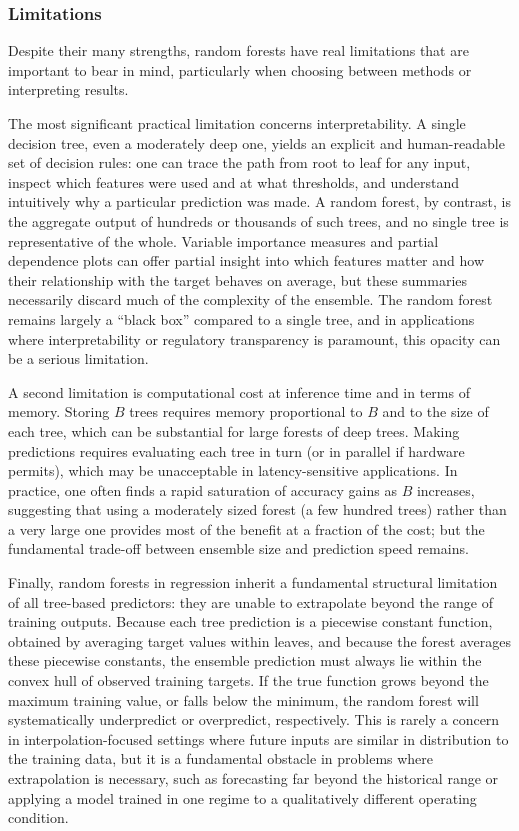\subsubsection*{Limitations}

Despite their many strengths, random forests have real limitations that are important to bear in mind, particularly when choosing between methods or interpreting results.

The most significant practical limitation concerns \alert{interpretability}. A single decision tree, even a moderately deep one, yields an explicit and human-readable set of decision rules: one can trace the path from root to leaf for any input, inspect which features were used and at what thresholds, and understand intuitively why a particular prediction was made. A random forest, by contrast, is the aggregate output of hundreds or thousands of such trees, and no single tree is representative of the whole. Variable importance measures and partial dependence plots can offer partial insight into which features matter and how their relationship with the target behaves on average, but these summaries necessarily discard much of the complexity of the ensemble. The random forest remains largely a ``black box'' compared to a single tree, and in applications where interpretability or regulatory transparency is paramount, this opacity can be a serious limitation.

A second limitation is computational cost at inference time and in terms of memory. Storing $B$ trees requires memory proportional to $B$ and to the size of each tree, which can be substantial for large forests of deep trees. Making predictions requires evaluating each tree in turn (or in parallel if hardware permits), which may be unacceptable in latency-sensitive applications. In practice, one often finds a rapid saturation of accuracy gains as $B$ increases, suggesting that using a moderately sized forest (a few hundred trees) rather than a very large one provides most of the benefit at a fraction of the cost; but the fundamental trade-off between ensemble size and prediction speed remains.

Finally, random forests in regression inherit a fundamental structural limitation of all tree-based predictors: they are \alert{unable to extrapolate} beyond the range of training outputs. Because each tree prediction is a piecewise constant function, obtained by averaging target values within leaves, and because the forest averages these piecewise constants, the ensemble prediction must always lie within the convex hull of observed training targets. If the true function grows beyond the maximum training value, or falls below the minimum, the random forest will systematically underpredict or overpredict, respectively. This is rarely a concern in interpolation-focused settings where future inputs are similar in distribution to the training data, but it is a fundamental obstacle in problems where extrapolation is necessary, such as forecasting far beyond the historical range or applying a model trained in one regime to a qualitatively different operating condition.

